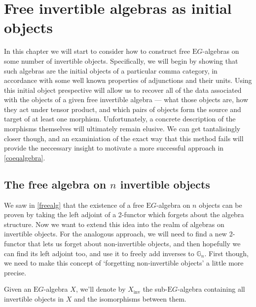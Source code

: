 \chapter{Free invertible algebras as initial objects}
\label{initialalgebra}

In this chapter we will start to consider how to construct free $\mathrm{E}G$-algebras on some number of invertible objects. Specifically, we will begin by showing that such algebras are the initial objects of a particular comma category, in accordance with some well known properties of adjunctions and their units. Using this initial object prespective will allow us to recover all of the data associated with the objects of a given free invertible algebra --- what those objects are, how they act under tensor product, and which pairs of objects form the source and target of at least one morphism. Unfortunately, a concrete description of the morphisms themselves will ultimately remain elusive. We can get tantalisingly closer though, and an examiniation of the exact way that this method fails will provide the neccessary insight to motivate a more successful approach in \cref{coeqalgebra}.

\section{The free algebra on $n$ invertible objects}

We saw in \cref{freealg} that the existence of a free $\mathrm{E}G$-algebra on $n$ objects can be proven by taking the left adjoint of a 2-functor which forgets about the algebra structure. Now we want to extend this idea into the realm of algebras on invertible objects. For the analogous approach, we will need to find a new 2-functor that lets us forget about non-invertible objects, and then hopefully we can find its left adjoint too, and use it to freely add inverses to $\mathbb{G}_n$. First though, we need to make this concept of `forgetting non-invertible objects' a little more precise.

\begin{defn} Given an $\mathrm{E}G$-algebra $X$, we'll denote by $X_{\mathrm{inv}}$ the sub-$\mathrm{E}G$-algebra containing all invertible objects in $X$ and the isomorphisms between them. \end{defn}

